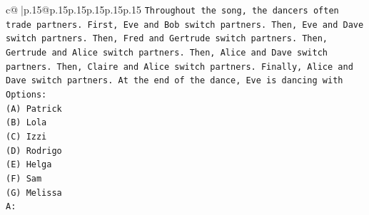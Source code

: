 \documentclass{article}
\begin{document}
{\begin{supertabular}{c@{$\;$}|p{.15\linewidth}@{}p{.15\linewidth}p{.15\linewidth}p{.15\linewidth}p{.15\linewidth}p{.15\linewidth}}
{{{\texttt{Throughout the song, the dancers often trade partners. First, Eve and Bob switch partners. Then, Eve and Dave switch partners. Then, Fred and Gertrude switch partners. Then, Gertrude and Alice switch partners. Then, Alice and Dave switch partners. Then, Claire and Alice switch partners. Finally, Alice and Dave switch partners. At the end of the dance, Eve is dancing with} \\
\texttt{Options:} \\
\texttt{(A) Patrick} \\
\texttt{(B) Lola} \\
\texttt{(C) Izzi} \\
\texttt{(D) Rodrigo} \\
\texttt{(E) Helga} \\
\texttt{(F) Sam} \\
\texttt{(G) Melissa} \\
\texttt{A:} \\
            }
        }
    }
     \\ \\


\end{supertabular}}
\end{document}
